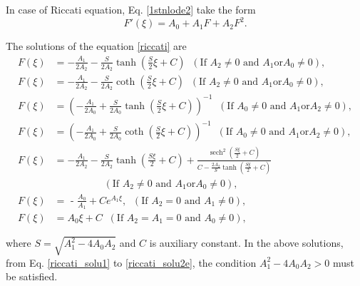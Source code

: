 \documentclass[prd,aps,floats,showkeys,nofootinbib,notitlepage]{revtex4-2}
\begin{document}
	In case of Riccati equation, Eq. \eqref{1stnlode2} take the form
	\begin{equation}\label{riccati}
		F'\left( \xi  \right) = {A_0} + {A_1}F + {A_2}{F^2}.
	\end{equation} 
	
	The solutions of the equation \eqref{riccati} are \cite{yang}
	\begin{subequations}\label{riccati_solu}
		\begin{align}
			\label{riccati_solu1}F\left( \xi  \right) &= - \frac{{{A_1}}}{{2{A_2}}} - \frac{S}{{2{A_2}}}\tanh \left( {\frac{S}{2}\xi  + C} \right) \;\;(\text{If } A_2 \neq 0 \text{ and } A_1 \text{or} A_0 \neq 0),\\
			F\left( \xi  \right) &= - \frac{{{A_1}}}{{2{A_2}}} - \frac{S}{{2{A_2}}}\coth \left( {\frac{S}{2}\xi  + C} \right) \;\;(\text{If } A_2 \neq 0 \text{ and } A_1 \text{or} A_0 \neq 0),\\
			F\left( \xi  \right) &= {\left( { - \frac{{{A_1}}}{{2{A_0}}} + \frac{S}{{2{A_0}}}\tanh \left( {\frac{S}{2}\xi  + C} \right)} \right)^{ - 1}} \;\;(\text{If }A_0 \neq 0 \text{ and } A_1 \text{or} A_2 \neq 0),\\
			F\left( \xi  \right) &= {\left( { - \frac{{{A_1}}}{{2{A_0}}} + \frac{S}{{2{A_0}}}\coth \left( {\frac{S}{2}\xi  + C} \right)} \right)^{ - 1}} \;\;(\text{If }A_0 \neq 0 \text{ and } A_1 \text{or} A_2 \neq 0),\\
			\label{riccati_solu2e}F\left( \xi  \right) &=  - \frac{{{A_1}}}{{2{A_2}}} - \frac{S }{{2{A_2}}}\tanh \left( {\frac{{S \xi }}{2}+C} \right) + \frac{{\operatorname{sech}^2 \left( {\frac{{S \xi }}{2}+C} \right)}}{{{C} - \frac{{2{A_2}}}{S }\tanh \left( {\frac{{S \xi }}{2}+C} \right)}}\\
			& \,\,\,\,\,\,\,\,\,\,\,\,\,\,\,\,\,\,\,\,\,\,\,\,\,\,\,\,\,\,(\text{If } A_2 \neq 0 \text{ and } A_1 \text{or} A_0 \neq 0),\nonumber\\
			\label{riccati_soluA2f}F\left( \xi  \right) &= {\text{ - }}\frac{{{A_0}}}{{{A_1}}} + C{e^{ {{A_1}\xi }}},\;\; (\text{If } A_2=0 \text{ and } A_1\neq 0),\\
			F\left( \xi  \right) &= A_0\xi +C\;\;(\text{If }  A_2=A_1=0 \text{ and } A_0\neq 0 ),	
		\end{align}
	\end{subequations}
	
	where $S = \sqrt{A_1^2-4A_0A_2}$ and $C$ is auxiliary constant. In the above solutions, from Eq. \eqref{riccati_solu1} to \eqref{riccati_solu2e}, the condition $A_1^2-4A_0A_2>0$ must be satisfied. 
	
\end{document}
